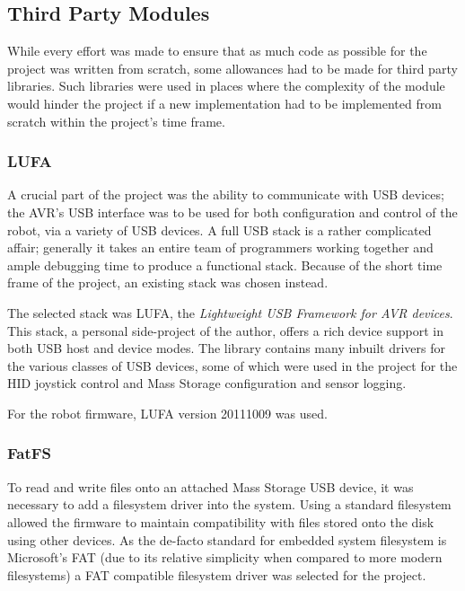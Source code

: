 \FloatBarrier
\subsection{Third Party Modules}

While every effort was made to ensure that as much code as possible for the project was written from scratch, some allowances had to be made for third party libraries. Such libraries were used in places where the complexity of the module would hinder the project if a new implementation had to be implemented from scratch within the project's time frame.

\FloatBarrier
\subsubsection{LUFA}

A crucial part of the project was the ability to communicate with USB devices; the AVR's USB interface was to be used for both configuration and control of the robot, via a variety of USB devices. A full USB stack is a rather complicated affair; generally it takes an entire team of programmers working together and ample debugging time to produce a functional stack. Because of the short time frame of the project, an existing stack was chosen instead.

The selected stack was LUFA, the \textit{Lightweight USB Framework for AVR devices}. This stack, a personal side-project of the author, offers a rich device support in both USB host and device modes. The library contains many inbuilt drivers for the various classes of USB devices, some of which were used in the project for the HID joystick control and Mass Storage configuration and sensor logging.

For the robot firmware, LUFA version 20111009 was used.

\FloatBarrier
\subsubsection{FatFS}

To read and write files onto an attached Mass Storage USB device, it was necessary to add a filesystem driver into the system. Using a standard filesystem allowed the firmware to maintain compatibility with files stored onto the disk using other devices. As the de-facto standard for embedded system filesystem is Microsoft's FAT (due to its relative simplicity when compared to more modern filesystems) a FAT compatible filesystem driver was selected for the project.


